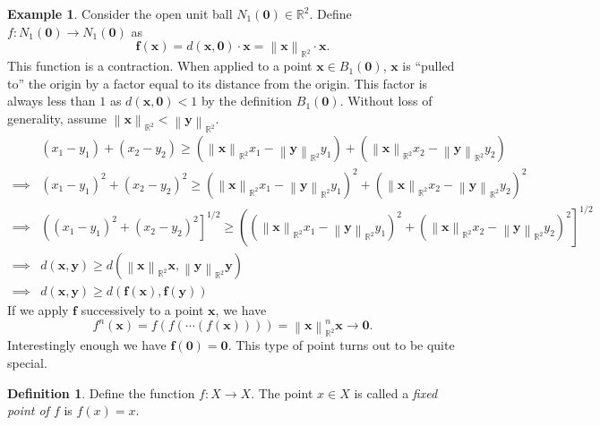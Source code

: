 \documentclass{article}
\newcommand{\R}{\mathbb{R}}
\newcommand{\x}{\mathbf{x}}
\newcommand{\f}{\mathbf{f}}
\newcommand{\y}{\mathbf{y}}
\newcommand{\ze}{\mathbf{0}}
\newcommand{\norm}[1]{\left\lVert#1\right\rVert}
\theoremstyle{definition}
\newtheorem{definition}{Definition}[section]
\newtheorem{example}{Example}[section]
\begin{document}
	\begin{example}
		Consider the open unit ball $N_1(\ze)\in \R^2 $. Define $ f: N_1(\ze)\to N_1(\ze) $ as $$\f(\x) = 
		d(\x,\ze)\cdot\x = \norm{\x}_{\R^2}\cdot \x .$$
		This function is a contraction. When applied to a point $ \x\in B_1(\ze)  $, $ \x $ is ``pulled to'' the origin by a factor equal to its distance from the origin. This factor is always less than $ 1 $ as $ d(\x,\ze) < 1$ by the definition $ B_1(\ze) $. Without loss of generality, assume $ \norm{\x}_{\R^2}  < \norm{\y}_{\R^2} $.
		\begin{align*}
			&(x_1-y_1) + (x_2-y_2)  \ge (\norm{\x}_{\R^2} x_1-\norm{\y}_{\R^2}y_1) + (\norm{\x}_{\R^2}x_2-\norm{\y}_{\R^2}y_2)\\ 
			\implies &	(x_1-y_1)^2 + (x_2-y_2)^2  \ge (\norm{\x}_{\R^2} x_1-\norm{\y}_{\R^2}y_1)^2 + (\norm{\x}_{\R^2}x_2-\norm{\y}_{\R^2}y_2)^2 \\
			\implies & \left((x_1-y_1)^2 + (x_2-y_2)^2 \right]^{1/2} \ge \left((\norm{\x}_{\R^2} x_1-\norm{\y}_{\R^2}y_1)^2 + (\norm{\x}_{\R^2}x_2-\norm{\y}_{\R^2}y_2)^2 \right]^{1/2}\\
			\implies & d(\x,\y) \ge d\left(\norm{\x}_{\R^2}\x, \norm{\y}_{\R^2}\y\right)\\
			\implies & d(\x,\y) \ge d\left(\f(\x), \f(\y)\right)
		\end{align*}
		If we apply $ \f $ successively to a point $ \x $, we have $$ f^n(\x) = f(f(\cdots(f(\x)))) = \norm{\x}_{\R^2}^n\x \to \ze.$$ 
		Interestingly enough we have $ \f(\ze) = \ze $. This type of point turns out to be quite special.
	\end{example}
	\begin{definition}\label{def}
		Define the function $ f:X\to X $. The point $ x\in X $ is called a \textit{\color{red}fixed point of $ f $} is $ f(x)=x $. 
	\end{definition}
	
\end{document}
